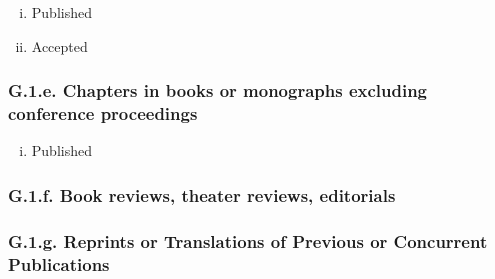 \documentclass[12pt]{article}
\begin{document}
{{\begin{enumerate}[i)]
\item  Published %

\item  Accepted %
\end{enumerate}

\subsubsection*{G.1.e. Chapters in books or monographs excluding conference proceedings}

\begin{enumerate}[i)]
\item Published %
\end{enumerate}


\subsubsection*{G.1.f. Book reviews, theater reviews, editorials}

\subsubsection*{G.1.g. Reprints or Translations of Previous or Concurrent Publications}

}}
\end{document}
